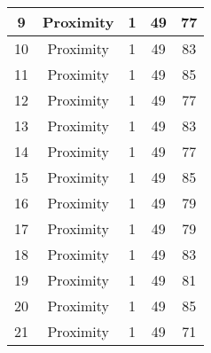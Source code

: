\documentclass[results.tex]{subfiles}
\begin{document}
\begin{center}
\begin{tabular}{| c || c | c | c | c |}
            \hline
            9                       & Proximity                    & 1                      & 49                      & 77                   \\
            \hline
            10                      & Proximity                    & 1                      & 49                      & 83                   \\
            \hline
            11                      & Proximity                    & 1                      & 49                      & 85                   \\
            \hline
            12                      & Proximity                    & 1                      & 49                      & 77                   \\
            \hline
            13                      & Proximity                    & 1                      & 49                      & 83                   \\
            \hline
            14                      & Proximity                    & 1                      & 49                      & 77                   \\
            \hline
            15                      & Proximity                    & 1                      & 49                      & 85                   \\
            \hline
            16                      & Proximity                    & 1                      & 49                      & 79                   \\
            \hline
            17                      & Proximity                    & 1                      & 49                      & 79                   \\
            \hline
            18                      & Proximity                    & 1                      & 49                      & 83                   \\
            \hline
            19                      & Proximity                    & 1                      & 49                      & 81                   \\
            \hline
            20                      & Proximity                    & 1                      & 49                      & 85                   \\
            \hline
            21                      & Proximity                    & 1                      & 49                      & 71                   \\

\end{tabular}
\end{center}
\end{document}
